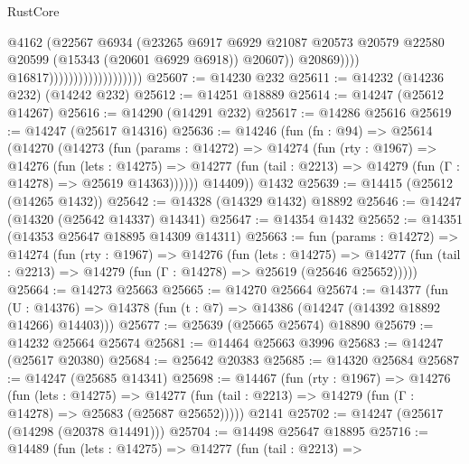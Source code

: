 \begin{lexlean}{RustCore}
\begin{coremodule}
                                                  @4162
                                                  (@22567
                                                    @6934
                                                    (@23265
                                                      @6917
                                                      @6929
                                                      @21087
                                                      @20573
                                                      @20579
                                                      @22580
                                                      @20599
                                                      (@15343 (@20601 @6929 @6918))
                                                      @20607))
                                                  @20869))))
                                          @16817)))))))))))))))))))
@25607 := @14230 @232
@25611 := @14232 (@14236 @232) (@14242 @232)
@25612 := @14251 @18889
@25614 := @14247 (@25612 @14267)
@25616 := @14290 (@14291 @232)
@25617 := @14286 @25616
@25619 := @14247 (@25617 @14316)
@25636 := @14246
    (fun (fn : @94) =>
    @25614
      (@14270
        (@14273
          (fun (params : @14272) =>
          @14274
            (fun (rty : @1967) =>
            @14276
              (fun (lets : @14275) =>
              @14277 (fun (tail : @2213) => @14279 (fun (Γ : @14278) => @25619 @14363))))))
        @14409))
    @1432
@25639 := @14415 (@25612 (@14265 @1432))
@25642 := @14328 (@14329 @1432) @18892
@25646 := @14247 (@14320 (@25642 @14337) @14341)
@25647 := @14354 @1432
@25652 := @14351 (@14353 @25647 @18895 @14309 @14311)
@25663 := fun (params : @14272) =>
  @14274
    (fun (rty : @1967) =>
    @14276
      (fun (lets : @14275) =>
      @14277 (fun (tail : @2213) => @14279 (fun (Γ : @14278) => @25619 (@25646 @25652)))))
@25664 := @14273 @25663
@25665 := @14270 @25664
@25674 := @14377
    (fun (U : @14376) => @14378 (fun (t : @7) => @14386 (@14247 (@14392 @18892 @14266) @14403)))
@25677 := @25639 (@25665 @25674) @18890
@25679 := @14232 @25664 @25674
@25681 := @14464 @25663 @3996
@25683 := @14247 (@25617 @20380)
@25684 := @25642 @20383
@25685 := @14320 @25684
@25687 := @14247 (@25685 @14341)
@25698 := @14467
    (fun (rty : @1967) =>
    @14276
      (fun (lets : @14275) =>
      @14277 (fun (tail : @2213) => @14279 (fun (Γ : @14278) => @25683 (@25687 @25652)))))
    @2141
@25702 := @14247 (@25617 (@14298 (@20378 @14491)))
@25704 := @14498 @25647 @18895
@25716 := @14489
    (fun (lets : @14275) =>
    @14277
      (fun (tail : @2213) =>

\end{coremodule}
\end{lexlean}
